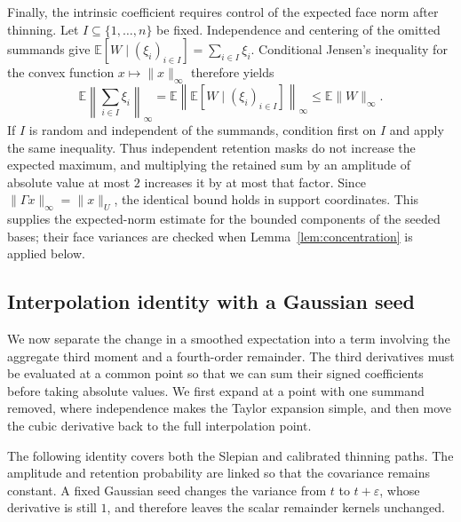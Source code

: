 \documentclass[11pt,letterpaper]{article}
\theoremstyle{remark}
\newcommand{\E}{\mathbb E}
\begin{document}
Finally, the intrinsic coefficient requires control of the expected
face norm after thinning. Let \(I\subseteq\{1,\ldots,n\}\) be fixed.
Independence and centering of the omitted summands give
\(\E[W\mid(\xi_i)_{i\in I}]=\sum_{i\in I}\xi_i\).
Conditional Jensen's inequality for the convex function
\(x\mapsto\|x\|_\infty\) therefore yields
\begin{equation}\label{appx-an:retained-maximum}
 \E\left\|\sum_{i\in I}\xi_i\right\|_\infty
 =\E\left\|\E[W\mid(\xi_i)_{i\in I}]\right\|_\infty
 \le\E\|W\|_\infty.
\end{equation}
If \(I\) is random and independent of the summands, condition first
on \(I\) and apply the same inequality. Thus independent retention
masks do not increase the expected maximum, and multiplying the
retained sum by an amplitude of absolute value at most \(2\)
increases it by at most that factor. Since
\(\|\Gamma x\|_\infty=\|x\|_U\), the identical bound holds in support
coordinates. This supplies the expected-norm estimate for the bounded
components of the seeded bases; their face variances are checked
when Lemma~\ref{lem:concentration} is applied below.

\subsection{Interpolation identity with a Gaussian seed}
\label{appx-an:sec:path}

We now separate the change in a smoothed expectation into a term
involving the aggregate third moment and a fourth-order remainder.
The third derivatives must be evaluated at a common point so that
we can sum their signed coefficients before taking absolute values.
We first expand at a point with one summand removed, where
independence makes the Taylor expansion simple, and then move the
cubic derivative back to the full interpolation point.

The following identity covers both the Slepian and calibrated
thinning paths. The amplitude and retention probability are linked
so that the covariance remains constant. A fixed Gaussian seed
changes the variance from \(t\) to \(t+\varepsilon\), whose derivative
is still \(1\), and therefore leaves the scalar remainder kernels
unchanged.
\end{document}
